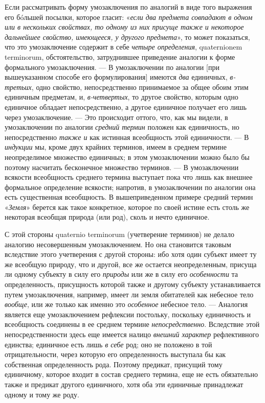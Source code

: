 \documentclass[twoside]{article}
\begin{document}
{{{{{{Если рассматривать форму умозаключения по аналогий в виде того
выражения его бóльшей посылки, которое гласит:
«{\em если два предмета совпадают в
одном или в нескольких свойствах, то одному из них присуще также и
некоторое дальнейшее свойство, имеющееся, у другого предмета}»,
то может показаться, что это умозаключение содержит в себе
{\em четыре определения}, quaternionem
terminorum, обстоятельство, затруднившее приведение аналогии
к форме формального умозаключения. — В умозаключении по
аналогии [при вышеуказанном способе его формулирования] имеются
{\em два} единичных,
{\em в-третьих}, одно
свойство, непосредственно принимаемое за общее обоим этим единичным
предметам, и, {\em в-четвертых},
то другое свойство, которым одно единичное обладает
непосредственно, а другое единичное получает его лишь через умозаключение.
— Это происходит оттого, что, как мы видели, в умозаключении
по аналогии {\em средний термин}
положен как единичность, но непосредственно
{\em также и} как
истинная всеобщность этой единичности. — В
{\em индукции} мы, кроме
двух крайних терминов, имеем в среднем термине неопределимое множество
единичных; в этом умозаключении можно было бы поэтому насчитать бесконечное
множество терминов. — В умозаключении всякости всеобщность
среднего термина выступает пока что лишь как внешнее формальное определение
всякости; напротив, в умозаключении по аналогии она есть существенная
всеобщность. В вышеприведенном примере средний термин
«{\em Земля}» берется как
такое конкретное, которое по своей истине есть столь же некоторая всеобщая
природа (или род), сколь и нечто единичное.

С этой стороны quaternio terminorum
(учетверение терминов) не делало аналогию несовершенным
умозаключением. Но она становится таковым вследствие этого учетверения с
другой стороны: ибо хотя один субъект имеет ту же всеобщую природу, что и
другой, все же остается неопределенным, присуща ли одному субъекту в силу
его {\em природы} или же
в силу его {\em особенности}
та определенность, присущность которой также и другому
субъекту устанавливается путем умозаключения, например, имеет ли земля
обитателей как небесное тело
{\em вообще}, или же
только как именно это {\em особенное}
небесное тело. — Аналогия является еще
умозаключением рефлексии постольку, поскольку единичность и всеобщность
соединены в ее среднем термине
{\em непосредственно}.
Вследствие этой непосредственности здесь еще имеется налицо
{\em внешний характер}
рефлективного единства; единичное есть лишь
{\em в себе} род; оно не
положено в той отрицательности, через которую его определенность выступала
бы как собственная определенность рода. Поэтому предикат, присущий тому
единичному, которое входит в состав среднего термина, еще не есть
обязательно также и предикат другого единичного, хотя оба эти единичные
принадлежат одному и тому же роду.

}}}}}}
\end{document}

